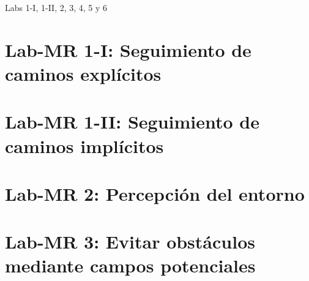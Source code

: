 \documentclass[12pt]{report}
\newcommand{\commonpath}{../../common}
\begin{document}
%
        {Labs 1-I, 1-II, 2, 3, 4, 5 y 6}

\tableofcontents
\clearpage


\chapter{Lab-MR 1-I: Seguimiento de caminos expl\'{i}citos}
\graphicspath{{../lab1-I_caminos_explicitos/figures/}{\commonpath/img/}}


\clearpage


\chapter{Lab-MR 1-II: Seguimiento de caminos impl\'{i}citos}
\graphicspath{{../lab1-II_caminos_implicitos/figures/}{\commonpath/img/}}


\clearpage


\chapter{Lab-MR 2: Percepci\'{o}n del entorno}
\graphicspath{{../lab2_percepcion/figures/}{\commonpath/img/}}


\clearpage


\chapter{Lab-MR 3: Evitar obst\'{a}culos mediante campos potenciales}
\graphicspath{{../lab3_campos_potenciales/figures/}{\commonpath/img/}}


\clearpage


\end{document}
